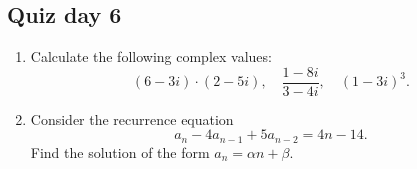 \documentclass[12pt]{article}
\begin{document}


\subsection*{Quiz day 6}

\begin{enumerate} 
    \item Calculate the following complex values: 
    \[
    (6 - 3i) \cdot (2 - 5i), \quad \frac{1 - 8i}{3 - 4i}, \quad (1 - 3i)^3.
    \]
    \item Consider the recurrence equation
    \[
    a_n - 4 a_{n-1} + 5 a_{n-2} = 4 n -14.
    \] 
    Find the solution of the form $a_n = \alpha n + \beta$.

\end{enumerate}
\end{document}
